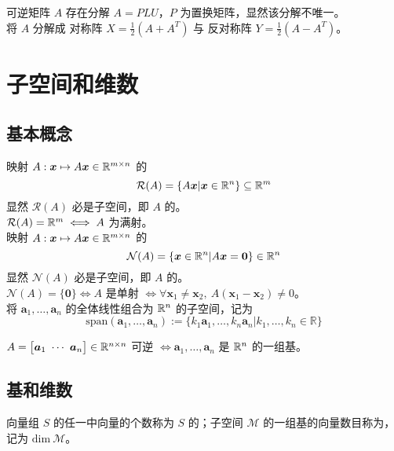\documentclass[./main.tex]{subfiles}
\begin{document}
可逆矩阵 $A$ 存在分解 $A=PLU$，$P$ 为置换矩阵，显然该分解不唯一。\\

将 $A$ 分解成 对称阵 $X=\frac{1}{2}(A+A^T)$ 与 反对称阵 $Y=\frac{1}{2}(A-A^T)$。

\section{子空间和维数}

\subsection{基本概念}

映射 $A:\bm{x}\mapsto A\bm{x}\in\mathbb{R}^{m\times n}$ 的
\begin{equation}
    \mathcal{R}(A)=\{A\bm{x}|\bm{x}\in\mathbb{R}^{n}\}\subseteq\mathbb{R}^{m}
\end{equation}
显然 $\mathcal{R}(A)$ 必是子空间，即 $A$ 的。\\

 $\mathcal{R}(A)=\mathbb{R}^{m}\iff A$ 为满射。\\

映射 $A:\bm{x}\mapsto A\bm{x}\in\mathbb{R}^{m\times n}$ 的
\begin{equation}
\mathcal{N}(A)=\{\bm{x}\in\mathbb{R}^{n}|A\bm{x}=\bm{0}\}\in\mathbb{R}^{n}
\end{equation}
显然 $\mathcal{N}(A)$ 必是子空间，即 $A$ 的。\\

 $\mathcal{N}(A)=\{\bm{0}\}\iff A$ 是单射 $\iff \forall\bm{x}_1\neq\bm{x}_2,\ A(\bm{x}_1-\bm{x}_2)\neq 0$。\\

将 $\bm{a}_1,\dots,\bm{a}_n$ 的全体线性组合为 $\mathbb{R}^{n}$ 的子空间，记为
\begin{equation}
\mathrm{span}(\bm{a}_1,\dots,\bm{a}_n):=\{k_1\bm{a}_1,\dots,k_n\bm{a}_n|k_1,\dots,k_n\in\mathbb{R}\}
\end{equation}

$A=\big[\bm{a}_1\ \cdots\ \bm{a}_n\big]\in\linsp{n\times n}$ 可逆 $\iff \bm{a}_1,\dots,\bm{a}_n$ 是 $\mathbb{R}^{n}$ 的一组基。

\subsection{基和维数}
向量组 $S$ 的任一中向量的个数称为 $S$ 的；子空间 $\mathcal{M}$ 的一组基的向量数目称为，记为 $\mathrm{dim}\ \mathcal{M}$。\\
\end{document}
